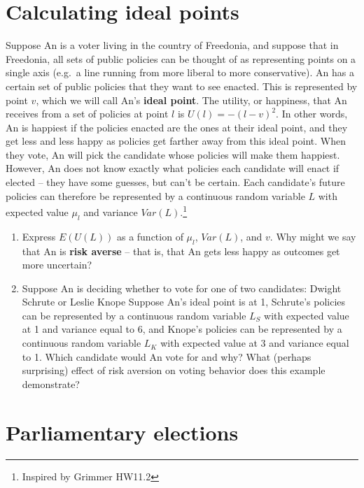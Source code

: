 \documentclass[
]{article}
\begin{document}
\section{Calculating ideal points}\label{calculating-ideal-points}

Suppose An is a voter living in the country of Freedonia, and suppose
that in Freedonia, all sets of public policies can be thought of as
representing points on a single axis (e.g.~a line running from more
liberal to more conservative). An has a certain set of public policies
that they want to see enacted. This is represented by point \(v\), which
we will call An's \textbf{ideal point}. The utility, or happiness, that
An receives from a set of policies at point \(l\) is \(U(l)=-(l-v)^2\).
In other words, An is happiest if the policies enacted are the ones at
their ideal point, and they get less and less happy as policies get
farther away from this ideal point. When they vote, An will pick the
candidate whose policies will make them happiest. However, An does not
know exactly what policies each candidate will enact if elected -- they
have some guesses, but can't be certain. Each candidate's future
policies can therefore be represented by a continuous random variable
\(L\) with expected value \(\mu_l\) and variance \(Var(L)\).\footnote{Inspired
  by Grimmer HW11.2}

\begin{enumerate}
\def\labelenumi{\alph{enumi}.}
\item
  Express \(E(U(L))\) as a function of \(\mu_l\), \(Var(L)\), and \(v\).
  Why might we say that An is \textbf{risk averse} -- that is, that An
  gets less happy as outcomes get more uncertain?

  \hfill\break
  \hfill\break
  \hfill\break
  \hfill\break
  \hfill\break
  \hfill\break
\item
  Suppose An is deciding whether to vote for one of two candidates:
  Dwight Schrute or Leslie Knope Suppose An's ideal point is at 1,
  Schrute's policies can be represented by a continuous random variable
  \(L_S\) with expected value at 1 and variance equal to 6, and Knope's
  policies can be represented by a continuous random variable \(L_K\)
  with expected value at 3 and variance equal to 1. Which candidate
  would An vote for and why? What (perhaps surprising) effect of risk
  aversion on voting behavior does this example demonstrate?
\end{enumerate}

\section{Parliamentary elections}\label{parliamentary-elections}
\end{document}
